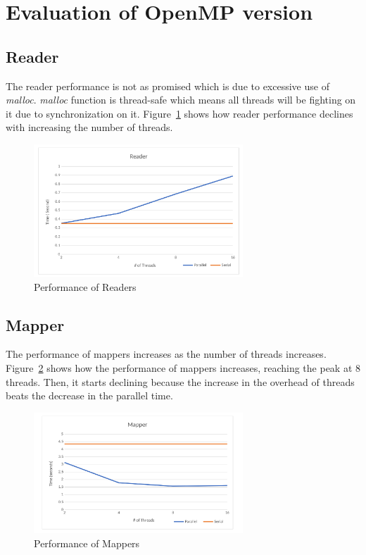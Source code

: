 \documentclass[12pt]{article}
\begin{document}
\section{Evaluation of OpenMP version}
\subsection{Reader}
The reader performance is not as promised which is due to excessive use of {\em malloc}. {\em malloc} function is thread-safe which means all threads will be fighting on it due to synchronization on it. Figure~\ref{fig:reader} shows how reader performance declines with increasing the number of threads. 
\begin{figure}[H]
\centering
\includegraphics[width=0.7\textwidth]{fig/reader.png}
\caption{Performance of Readers \label{fig:reader}}
\end{figure}

\subsection{Mapper}
The performance of mappers increases as the number of threads increases. Figure~\ref{fig:mapper} shows how the performance of mappers increases, reaching the peak at 8 threads. Then, it starts declining because the increase in the overhead of threads beats the decrease in the parallel time.
\begin{figure}[H]
\centering
\includegraphics[width=0.7\textwidth]{fig/mapper.png}
\caption{Performance of Mappers \label{fig:mapper}}
\end{figure}
\end{document}
